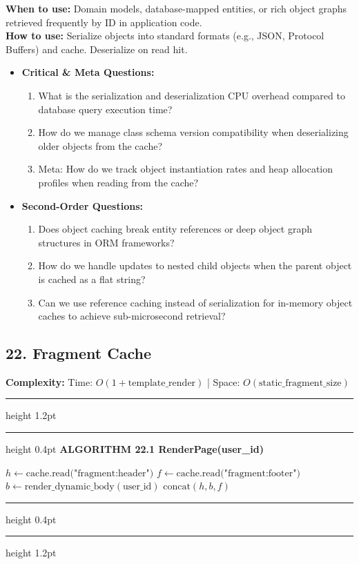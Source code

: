 \documentclass[11pt,a4paper]{article}
\newenvironment{textbookalgo}[2]{%
  \par\addvspace{1.2em}\noindent
  \hrule height 1.2pt
  \vspace{1.5pt}
  \hrule height 0.4pt
  \vspace{5pt}
  {\noindent\large\bfseries\sffamily ALGORITHM #1 \quad #2}
  \par\vspace{5pt}
  \RestyleAlgo{plain}
}{%
  \par\vspace{4pt}
  \hrule height 0.4pt
  \vspace{1.5pt}
  \hrule height 1.2pt
  \par\addvspace{1.2em}
}
\theoremstyle{definition}
\begin{document}
\noindent
\textbf{When to use:} Domain models, database-mapped entities, or rich object graphs retrieved frequently by ID in application code.\\
\textbf{How to use:} Serialize objects into standard formats (e.g., JSON, Protocol Buffers) and cache. Deserialize on read hit.
\begin{itemize}[leftmargin=*]
  \item[] \textbf{Critical \& Meta Questions:}
  \begin{enumerate}
  \item What is the serialization and deserialization CPU overhead compared to database query execution time?
  \item How do we manage class schema version compatibility when deserializing older objects from the cache?
  \item Meta: How do we track object instantiation rates and heap allocation profiles when reading from the cache?
  \end{enumerate}
  \item[] \textbf{Second-Order Questions:}
  \begin{enumerate}
  \item Does object caching break entity references or deep object graph structures in ORM frameworks?
  \item How do we handle updates to nested child objects when the parent object is cached as a flat string?
  \item Can we use reference caching instead of serialization for in-memory object caches to achieve sub-microsecond retrieval?
  \end{enumerate}
\end{itemize}
\medskip

\clearpage
\subsection{22. Fragment Cache}

\noindent
\textbf{Complexity:} Time: $O(1 + \text{template\_render})$ | Space: $O(\text{static\_fragment\_size})$
\smallskip

\begin{textbookalgo}{22.1}{RenderPage(user\_id)}
\begin{algorithm}[H]
$h \leftarrow \text{cache.read("fragment:header")}$\;
$f \leftarrow \text{cache.read("fragment:footer")}$\;
$b \leftarrow \text{render\_dynamic\_body}(\text{user\_id})$\;
\Return $\text{concat}(h, b, f)$\;
\end{algorithm}
\end{textbookalgo}
\end{document}
